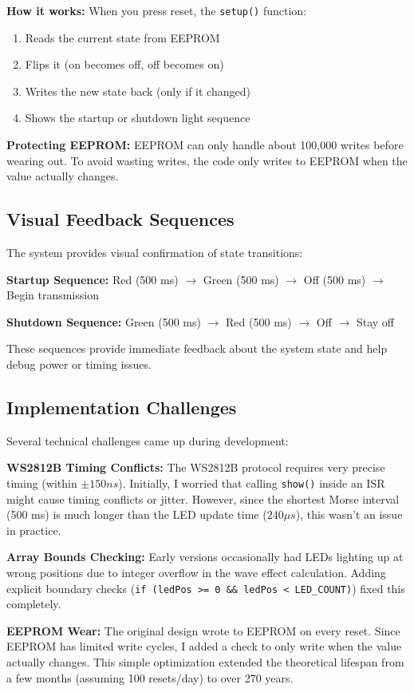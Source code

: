 \documentclass[report]{IEEEtran}
\begin{document}
\textbf{How it works:}
When you press reset, the \texttt{setup()} function:
\begin{enumerate}
    \item Reads the current state from EEPROM
    \item Flips it (on becomes off, off becomes on)
    \item Writes the new state back (only if it changed)
    \item Shows the startup or shutdown light sequence
\end{enumerate}

\textbf{Protecting EEPROM:}
EEPROM can only handle about 100,000 writes before wearing out. To avoid wasting writes, the code only writes to EEPROM when the value actually changes.

\subsection{Visual Feedback Sequences}
The system provides visual confirmation of state transitions:

\textbf{Startup Sequence:}
Red (500 ms) $\rightarrow$ Green (500 ms) $\rightarrow$ Off (500 ms) $\rightarrow$ Begin transmission

\textbf{Shutdown Sequence:}
Green (500 ms) $\rightarrow$ Red (500 ms) $\rightarrow$ Off $\rightarrow$ Stay off

These sequences provide immediate feedback about the system state and help debug power or timing issues.

\subsection{Implementation Challenges}
Several technical challenges came up during development:

\textbf{WS2812B Timing Conflicts:}
The WS2812B protocol requires very precise timing (within $\pm150ns$). Initially, I worried that calling \texttt{show()} inside an ISR might cause timing conflicts or jitter. However, since the shortest Morse interval (500 ms) is much longer than the LED update time ($240\mu s$), this wasn't an issue in practice.

\textbf{Array Bounds Checking:}
Early versions occasionally had LEDs lighting up at wrong positions due to integer overflow in the wave effect calculation. Adding explicit boundary checks (\texttt{if (ledPos >= 0 \&\& ledPos < LED\_COUNT)}) fixed this completely.

\textbf{EEPROM Wear:}
The original design wrote to EEPROM on every reset. Since EEPROM has limited write cycles, I added a check to only write when the value actually changes. This simple optimization extended the theoretical lifespan from a few months (assuming 100 resets/day) to over 270 years.
\end{document}
